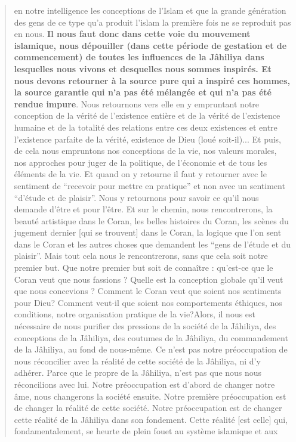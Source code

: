 \begin{quote}
en notre intelligence les conceptions de l'Islam et que la grande
génération des gens de ce type qu'a produit l'islam la première fois ne
se reproduit pas en nous. \textbf{Il nous faut donc dans cette voie du
mouvement islamique, nous dépouiller (dans cette période de gestation et
de commencement) de toutes les influences de la Jâhiliya dans lesquelles
nous vivons et desquelles nous sommes inspirés. Et nous devons retourner
à la source pure qui a inspiré ces hommes, la source garantie qui n'a
pas été mélangée et qui n'a pas été rendue impure}. Nous retournons vers
elle en y empruntant notre conception de la vérité de l'existence
entière et de la vérité de l'existence humaine et de la totalité des
relations entre ces deux existences et entre l'existence parfaite de la
vérité, existence de Dieu (loué soit-il)... Et puis, de cela nous
empruntons nos conceptions de la vie, nos valeurs morales, nos approches
pour juger de la politique, de l'économie et de tous les éléments de la
vie. Et quand on y retourne il faut y retourner avec le sentiment de
``recevoir pour mettre en pratique'' et non avec un sentiment ``d'étude
et de plaisir''. Nous y retournons pour savoir ce qu'il nous demande
d'être et pour l'être. Et sur le chemin, nous rencontrerons, la beauté
artistique dans le Coran, les belles histoires du Coran, les scènes du
jugement dernier {[}qui se trouvent{]} dans le Coran, la logique que
l'on sent dans le Coran et les autres choses que demandent les ``gens de
l'étude et du plaisir''. Mais tout cela nous le rencontrerons, sans que
cela soit notre premier but. Que notre premier but soit de connaître :
qu'est-ce que le Coran veut que nous fassions ? Quelle est la conception
globale qu'il veut que nous concevions ? Comment le Coran veut que
soient nos sentiments pour Dieu? Comment veut-il que soient nos
comportements éthiques, nos conditions, notre organisation pratique de
la vie?Alors, il nous est nécessaire de nous purifier des pressions de
la société de la Jâhiliya, des conceptions de la Jâhiliya, des coutumes
de la Jâhiliya, du commandement de la Jâhiliya, au fond de nous-même. Ce
n'est pas notre préoccupation de nous réconcilier avec la réalité de
cette société de la Jâhiliya, ni d'y adhérer. Parce que le propre de la
Jâhiliya, n'est pas que nous nous réconcilions avec lui. Notre
préoccupation est d'abord de changer notre âme, nous changerons la
société ensuite. Notre première préoccupation est de changer la réalité
de cette société. Notre préoccupation est de changer cette réalité de la
Jâhiliya dans son fondement. Cette réalité {[}est celle{]} qui,
fondamentalement, se heurte de plein fouet au système islamique et aux

\end{quote}
